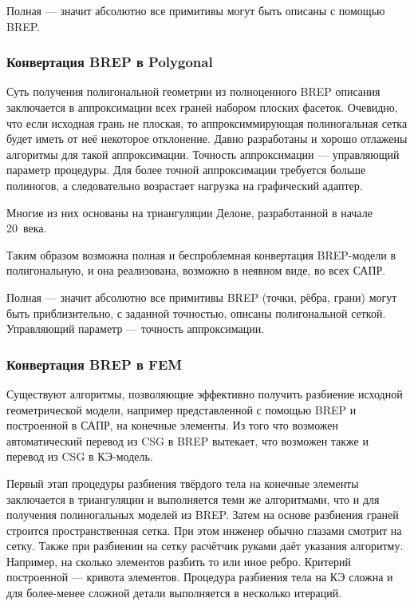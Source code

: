 Полная --- значит абсолютно все примитивы могут быть описаны с помощью BREP.

\subsubsection{Конвертация BREP в Polygonal}\label{sec:secBREPtoPolygonal}

Суть получения полигональной геометрии из полноценного BREP описания заключается в аппроксимации всех граней набором плоских фасеток. Очевидно, что если исходная грань не плоская, то аппроксиммирующая полиногальная сетка будет иметь от неё некоторое отклонение.
Давно разработаны и хорошо отлажены алгоритмы для такой аппроксимации. Точность аппроксимации --- управляющий параметр процедуры. Для более точной аппроксимации требуется больше полиногов, а следовательно возрастает нагрузка на графический адаптер.

Многие из них основаны на триангуляции Делоне, разработанной в начале 20~века.

Таким образом возможна полная и \todo беспроблемная \todo конвертация BREP-модели в полигональную, и она реализована, возможно в неявном виде, во всех САПР.

Полная --- значит абсолютно все примитивы BREP (точки, рёбра, грани) могут быть приблизительно, с заданной точностью, описаны полигональной сеткой. Управляющий параметр --- точность аппроксимации.

\subsubsection{Конвертация BREP в FEM}\label{sec:secBREPtoFEM}

Существуют алгоритмы, позволяющие эффективно получить разбиение исходной геометрической модели, например представленной с помощью BREP и построенной в САПР, на конечные элементы. Из того что возможен автоматический перевод из CSG в BREP вытекает, что возможен также и перевод из CSG в КЭ-модель.

Первый этап процедуры разбиения твёрдого тела на конечные элементы заключается в триангуляции и выполняется теми же алгоритмами, что и для получения полиногальных моделей из BREP. Затем на основе разбиения граней строится пространственная сетка.
При этом инженер обычно глазами смотрит на сетку. Также при разбиении на сетку расчётчик руками даёт указания алгоритму. Например, на сколько элементов разбить то или иное ребро. Критерий построенной --- кривота элементов. Процедура разбиения тела на КЭ сложна и для более-менее сложной детали выполняется в несколько итераций. 


